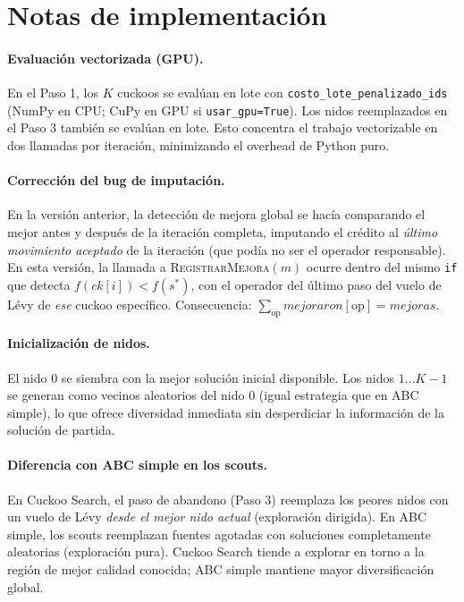 \documentclass[12pt, a4paper]{article}
\begin{document}
\section{Notas de implementación}

\paragraph{Evaluación vectorizada (GPU).}
En el Paso 1, los $K$ cuckoos se evalúan en lote con
\texttt{costo\_lote\_penalizado\_ids} (NumPy en CPU; CuPy en GPU si
\texttt{usar\_gpu=True}). Los nidos reemplazados en el Paso 3 también se evalúan
en lote. Esto concentra el trabajo vectorizable en dos llamadas por iteración,
minimizando el overhead de Python puro.

\paragraph{Corrección del bug de imputación.}
En la versión anterior, la detección de mejora global se hacía comparando el
mejor antes y después de la iteración completa, imputando el crédito al
\emph{último movimiento aceptado} de la iteración (que podía no ser el operador
responsable). En esta versión, la llamada a \textsc{RegistrarMejora}$(m)$ ocurre
dentro del mismo \texttt{if} que detecta $f(\mathit{ck}[i]) < f(s^{*})$, con el
operador del último paso del vuelo de Lévy de \emph{ese} cuckoo específico.
Consecuencia: $\sum_{\mathrm{op}}\mathit{mejoraron}[\mathrm{op}] = \mathit{mejoras}$.

\paragraph{Inicialización de nidos.}
El nido 0 se siembra con la mejor solución inicial disponible. Los nidos
$1 \ldots K-1$ se generan como vecinos aleatorios del nido 0 (igual estrategia
que en ABC simple), lo que ofrece diversidad inmediata sin desperdiciar la
información de la solución de partida.

\paragraph{Diferencia con ABC simple en los scouts.}
En Cuckoo Search, el paso de abandono (Paso 3) reemplaza los peores nidos con
un vuelo de Lévy \emph{desde el mejor nido actual} (exploración dirigida). En
ABC simple, los scouts reemplazan fuentes agotadas con soluciones completamente
aleatorias (exploración pura). Cuckoo Search tiende a explorar en torno a la
región de mejor calidad conocida; ABC simple mantiene mayor diversificación global.
\end{document}
